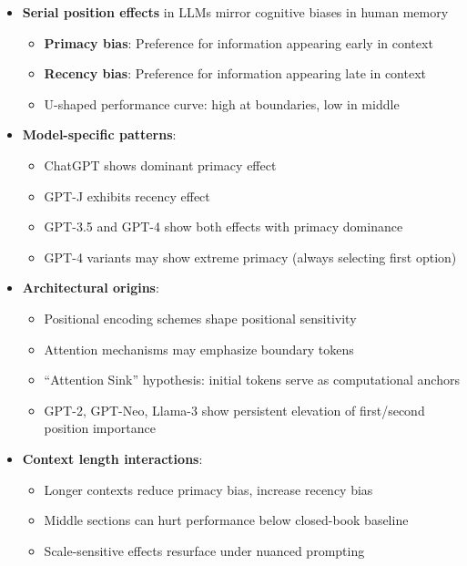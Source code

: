 \documentclass[11pt,letterpaper]{article}
\begin{document}
\begin{itemize}[leftmargin=*]
\item \textbf{Serial position effects} in LLMs mirror cognitive biases in human memory
  \begin{itemize}
  \item \textbf{Primacy bias}: Preference for information appearing early in context
  \item \textbf{Recency bias}: Preference for information appearing late in context
  \item U-shaped performance curve: high at boundaries, low in middle
  \end{itemize}

\item \textbf{Model-specific patterns}:
  \begin{itemize}
  \item ChatGPT shows dominant primacy effect
  \item GPT-J exhibits recency effect
  \item GPT-3.5 and GPT-4 show both effects with primacy dominance
  \item GPT-4 variants may show extreme primacy (always selecting first option)
  \end{itemize}

\item \textbf{Architectural origins}:
  \begin{itemize}
  \item Positional encoding schemes shape positional sensitivity
  \item Attention mechanisms may emphasize boundary tokens
  \item ``Attention Sink'' hypothesis: initial tokens serve as computational anchors
  \item GPT-2, GPT-Neo, Llama-3 show persistent elevation of first/second position importance
  \end{itemize}

\item \textbf{Context length interactions}:
  \begin{itemize}
  \item Longer contexts reduce primacy bias, increase recency bias
  \item Middle sections can hurt performance below closed-book baseline
  \item Scale-sensitive effects resurface under nuanced prompting
  \end{itemize}
\end{itemize}
\end{document}
